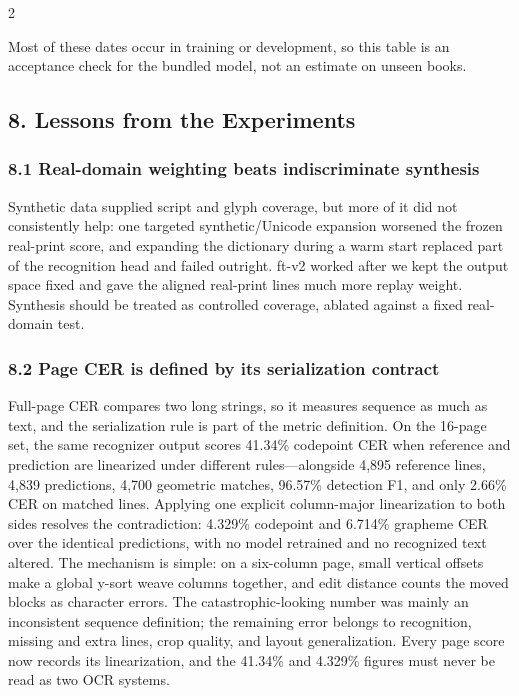 \documentclass[
  10pt,
]{article}
\begin{document}
\begin{multicols}{2}

Most of these dates occur in training or development, so this table is
an acceptance check for the bundled model, not an estimate on unseen
books.

\subsection{8. Lessons from the
Experiments}\label{lessons-from-the-experiments}

\subsubsection{8.1 Real-domain weighting beats indiscriminate
synthesis}\label{real-domain-weighting-beats-indiscriminate-synthesis}

Synthetic data supplied script and glyph coverage, but more of it did
not consistently help: one targeted synthetic/Unicode expansion worsened
the frozen real-print score, and expanding the dictionary during a warm
start replaced part of the recognition head and failed outright. ft-v2
worked after we kept the output space fixed and gave the aligned
real-print lines much more replay weight. Synthesis should be treated as
controlled coverage, ablated against a fixed real-domain test.

\subsubsection{8.2 Page CER is defined by its serialization
contract}\label{page-cer-is-defined-by-its-serialization-contract}

Full-page CER compares two long strings, so it measures sequence as much
as text, and the serialization rule is part of the metric definition. On
the 16-page set, the same recognizer output scores 41.34\% codepoint CER
when reference and prediction are linearized under different
rules---alongside 4,895 reference lines, 4,839 predictions, 4,700
geometric matches, 96.57\% detection F1, and only 2.66\% CER on matched
lines. Applying one explicit column-major linearization to both sides
resolves the contradiction: 4.329\% codepoint and 6.714\% grapheme CER
over the identical predictions, with no model retrained and no
recognized text altered. The mechanism is simple: on a six-column page,
small vertical offsets make a global y-sort weave columns together, and
edit distance counts the moved blocks as character errors. The
catastrophic-looking number was mainly an inconsistent sequence
definition; the remaining error belongs to recognition, missing and
extra lines, crop quality, and layout generalization. Every page score
now records its linearization, and the 41.34\% and 4.329\% figures must
never be read as two OCR systems.


\end{multicols}
\end{document}
